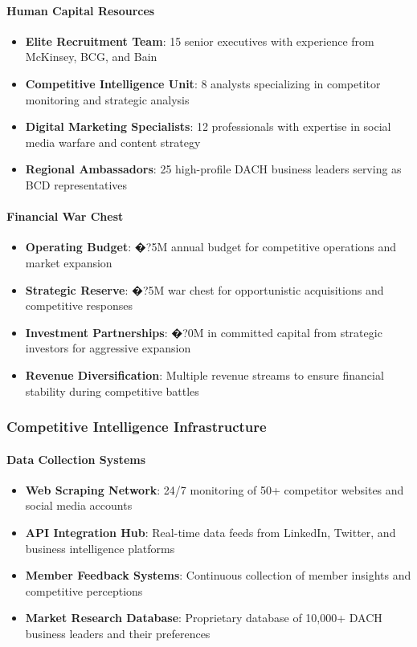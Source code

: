 \paragraph{Human Capital Resources}
\begin{itemize}
    \item \textbf{Elite Recruitment Team}: 15 senior executives with experience from McKinsey, BCG, and Bain
    \item \textbf{Competitive Intelligence Unit}: 8 analysts specializing in competitor monitoring and strategic analysis
    \item \textbf{Digital Marketing Specialists}: 12 professionals with expertise in social media warfare and content strategy
    \item \textbf{Regional Ambassadors}: 25 high-profile DACH business leaders serving as BCD representatives
\end{itemize}

\paragraph{Financial War Chest}
\begin{itemize}
    \item \textbf{Operating Budget}: �?5M annual budget for competitive operations and market expansion
    \item \textbf{Strategic Reserve}: �?5M war chest for opportunistic acquisitions and competitive responses
    \item \textbf{Investment Partnerships}: �?0M in committed capital from strategic investors for aggressive expansion
    \item \textbf{Revenue Diversification}: Multiple revenue streams to ensure financial stability during competitive battles
\end{itemize}

\subsubsection{Competitive Intelligence Infrastructure}

\paragraph{Data Collection Systems}
\begin{itemize}
    \item \textbf{Web Scraping Network}: 24/7 monitoring of 50+ competitor websites and social media accounts
    \item \textbf{API Integration Hub}: Real-time data feeds from LinkedIn, Twitter, and business intelligence platforms
    \item \textbf{Member Feedback Systems}: Continuous collection of member insights and competitive perceptions
    \item \textbf{Market Research Database}: Proprietary database of 10,000+ DACH business leaders and their preferences
\end{itemize}

